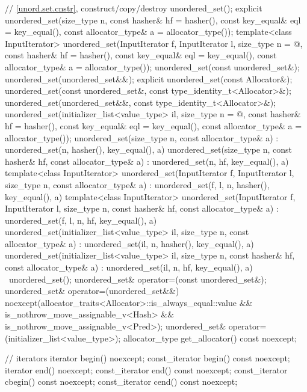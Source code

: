 \begin{codeblock}
{{    // \ref{unord.set.cnstr}, construct/copy/destroy
    unordered_set();
    explicit unordered_set(size_type n,
                           const hasher& hf = hasher(),
                           const key_equal& eql = key_equal(),
                           const allocator_type& a = allocator_type());
    template<class InputIterator>
      unordered_set(InputIterator f, InputIterator l,
                    size_type n = @\seebelow@,
                    const hasher& hf = hasher(),
                    const key_equal& eql = key_equal(),
                    const allocator_type& a = allocator_type());
    unordered_set(const unordered_set&);
    unordered_set(unordered_set&&);
    explicit unordered_set(const Allocator&);
    unordered_set(const unordered_set&, const type_identity_t<Allocator>&);
    unordered_set(unordered_set&&, const type_identity_t<Allocator>&);
    unordered_set(initializer_list<value_type> il,
                  size_type n = @\seebelow@,
                  const hasher& hf = hasher(),
                  const key_equal& eql = key_equal(),
                  const allocator_type& a = allocator_type());
    unordered_set(size_type n, const allocator_type& a)
      : unordered_set(n, hasher(), key_equal(), a) { }
    unordered_set(size_type n, const hasher& hf, const allocator_type& a)
      : unordered_set(n, hf, key_equal(), a) { }
    template<class InputIterator>
      unordered_set(InputIterator f, InputIterator l, size_type n, const allocator_type& a)
        : unordered_set(f, l, n, hasher(), key_equal(), a) { }
    template<class InputIterator>
      unordered_set(InputIterator f, InputIterator l, size_type n, const hasher& hf,
                    const allocator_type& a)
      : unordered_set(f, l, n, hf, key_equal(), a) { }
    unordered_set(initializer_list<value_type> il, size_type n, const allocator_type& a)
      : unordered_set(il, n, hasher(), key_equal(), a) { }
    unordered_set(initializer_list<value_type> il, size_type n, const hasher& hf,
                  const allocator_type& a)
      : unordered_set(il, n, hf, key_equal(), a) { }
    ~unordered_set();
    unordered_set& operator=(const unordered_set&);
    unordered_set& operator=(unordered_set&&)
      noexcept(allocator_traits<Allocator>::is_always_equal::value &&
               is_nothrow_move_assignable_v<Hash> &&
               is_nothrow_move_assignable_v<Pred>);
    unordered_set& operator=(initializer_list<value_type>);
    allocator_type get_allocator() const noexcept;

    // iterators
    iterator       begin() noexcept;
    const_iterator begin() const noexcept;
    iterator       end() noexcept;
    const_iterator end() const noexcept;
    const_iterator cbegin() const noexcept;
    const_iterator cend() const noexcept;

}}
\end{codeblock}
